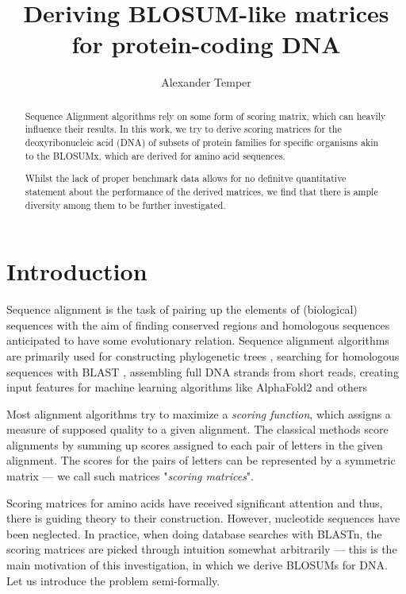 \documentclass{article}
\title{Deriving BLOSUM-like matrices for protein-coding DNA}
\author{Alexander Temper}
\begin{document}
\maketitle

\begin{abstract}
    Sequence Alignment algorithms rely on some form of scoring matrix,
    which can heavily influence their results. In this work, we try to derive
    scoring matrices for the deoxyribonucleic acid (DNA) of subsets of protein
    families for specific organisms akin to
    the BLOSUMx, which are derived for amino acid sequences.

    Whilst the lack of proper benchmark data allows for no definitve quantitative
    statement about the performance of the derived matrices, we find that there is ample diversity among them to be further investigated.
\end{abstract}

\tableofcontents

\section{Introduction} Sequence alignment is the task of pairing up the
elements of (biological) sequences with the aim of finding conserved
regions and homologous sequences anticipated to have some
evolutionary relation. Sequence alignment algorithms are primarily used for
constructing phylogenetic trees \cite{chatzouMultipleSequenceAlignment2016}, searching for homologous sequences with BLAST \cite{altschulBasicLocalAlignment1990},
assembling full DNA strands from short reads, creating input features for
machine learning algorithms like AlphaFold2 \cite{jumperHighlyAccurateProtein2021a} and others \cite{chatzouMultipleSequenceAlignment2016}

Most alignment algorithms try to maximize a \emph{scoring function},
which assigns a measure of supposed quality to a given alignment.
The classical methods score
alignments by summing up scores assigned to each pair of letters in the given
alignment. The scores for the pairs of letters can be represented by a
symmetric matrix --- we call such matrices "\emph{scoring matrices}".

Scoring matrices for amino acids have received significant attention and thus,
there is guiding theory to their construction. However, 
nucleotide sequences have been neglected. In practice, when doing database searches
with BLASTn, the scoring matrices are picked through intuition somewhat arbitrarily
--- this is the main motivation of this investigation, in which we derive BLOSUMs 
for DNA. Let us introduce the problem semi-formally.
\end{document}
